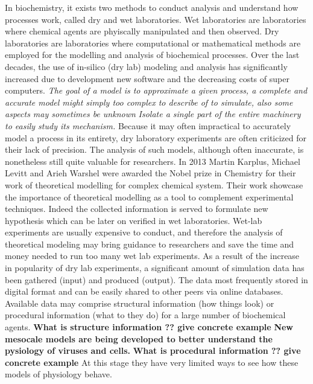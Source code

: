 In biochemistry, it exists two methods to conduct analysis and understand how processes work, called dry and wet laboratories.
Wet laboratories are laboratories where chemical agents are phyiscally manipulated and then observed.
Dry laboratories are laboratories where computational or mathematical methods are employed for the modelling and analysis of biochemical processes. 
Over the last decades, the use of in-silico (dry lab) modeling and analysis has significantly increased due to development new software and the decreasing costs of super computers.
\textit{The goal of a model is to approximate a given process, a complete and accurate model might simply too complex to describe of to simulate, also some aspects may sometimes be unknown}
\textit{Isolate a single part of the entire machinery to easily study its mechanism.}
Because it may often impractical to accurately model a process in its entirety, dry laboratory experiments are often criticized for their lack of precision.
The analysis of such models, although often inaccurate, is nonetheless still quite valuable for researchers.
In 2013 Martin Karplus, Michael Levitt and Arieh Warshel were awarded the Nobel prize in Chemistry for their work of theoretical modelling for complex chemical system.
Their work showcase the importance of theoretical modelling as a tool to complement experimental techniques.
Indeed the collected information is served to formulate new hypothesis which can be later on verified in wet laboratories.
Wet-lab experiments are usually expensive to conduct, and therefore the analysis of theoretical modeling may bring guidance to researchers and save the time and money needed to run too many wet lab experiments.
As a result of the increase in popularity of dry lab experiments, a significant amount of simulation data has been gathered (input) and produced (output).
The data most frequently stored in digital format and can be easily shared to other peers via online databases.
Available data may comprise structural information (how things look) or procedural information (what to they do) for a large number of biochemical agents.
\textbf{What is structure information ?? give concrete example}
\textbf{New mesocale models are being developed to better understand the pysiology of viruses and cells.}
\textbf{What is procedural information ?? give concrete example}
At this stage they have very limited ways to see how these models of physiology behave. 
